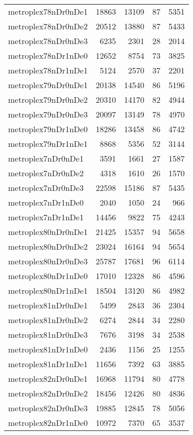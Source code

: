 \begin{longtable}{lrrrr}
metroplex78nDr0nDe1 & 18863 & 13109 & 87 & 5351 \\
metroplex78nDr0nDe2 & 20512 & 13880 & 87 & 5433 \\
metroplex78nDr0nDe3 & 6235 & 2301 & 28 & 2014 \\
metroplex78nDr1nDe0 & 12652 & 8754 & 73 & 3825 \\
metroplex78nDr1nDe1 & 5124 & 2570 & 37 & 2201 \\
metroplex79nDr0nDe1 & 20138 & 14540 & 86 & 5196 \\
metroplex79nDr0nDe2 & 20310 & 14170 & 82 & 4944 \\
metroplex79nDr0nDe3 & 20097 & 13149 & 78 & 4970 \\
metroplex79nDr1nDe0 & 18286 & 13458 & 86 & 4742 \\
metroplex79nDr1nDe1 & 8868 & 5356 & 52 & 3144 \\
metroplex7nDr0nDe1 & 3591 & 1661 & 27 & 1587 \\
metroplex7nDr0nDe2 & 4318 & 1610 & 26 & 1570 \\
metroplex7nDr0nDe3 & 22598 & 15186 & 87 & 5435 \\
metroplex7nDr1nDe0 & 2040 & 1050 & 24 & 966 \\
metroplex7nDr1nDe1 & 14456 & 9822 & 75 & 4243 \\
metroplex80nDr0nDe1 & 21425 & 15357 & 94 & 5658 \\
metroplex80nDr0nDe2 & 23024 & 16164 & 94 & 5654 \\
metroplex80nDr0nDe3 & 25787 & 17681 & 96 & 6114 \\
metroplex80nDr1nDe0 & 17010 & 12328 & 86 & 4596 \\
metroplex80nDr1nDe1 & 18504 & 13120 & 86 & 4982 \\
metroplex81nDr0nDe1 & 5499 & 2843 & 36 & 2304 \\
metroplex81nDr0nDe2 & 6274 & 2844 & 34 & 2280 \\
metroplex81nDr0nDe3 & 7676 & 3198 & 34 & 2538 \\
metroplex81nDr1nDe0 & 2436 & 1156 & 25 & 1255 \\
metroplex81nDr1nDe1 & 11656 & 7392 & 63 & 3885 \\
metroplex82nDr0nDe1 & 16968 & 11794 & 80 & 4778 \\
metroplex82nDr0nDe2 & 18456 & 12426 & 80 & 4836 \\
metroplex82nDr0nDe3 & 19885 & 12845 & 78 & 5056 \\
metroplex82nDr1nDe0 & 10972 & 7370 & 65 & 3537 \\

\end{longtable}
